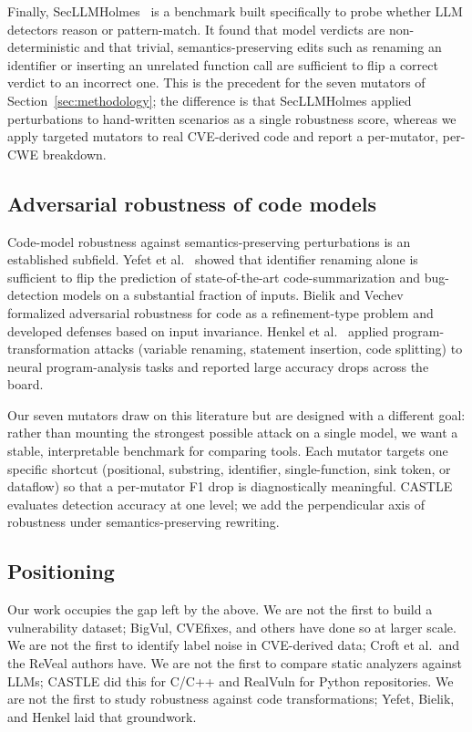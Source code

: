 Finally, SecLLMHolmes~\cite{secllmholmes} is a benchmark built
specifically to probe whether LLM detectors reason or pattern-match.
It found that model verdicts are non-deterministic and that trivial,
semantics-preserving edits such as renaming an identifier or inserting
an unrelated function call are sufficient to flip a correct verdict
to an incorrect one. This is the precedent for the seven mutators of
Section~\ref{sec:methodology}; the difference is that SecLLMHolmes
applied perturbations to hand-written scenarios as a single robustness
score, whereas we apply targeted mutators to real CVE-derived code and
report a per-mutator, per-CWE breakdown.

\subsection{Adversarial robustness of code models}
\label{sec:related:adv}

Code-model robustness against semantics-preserving perturbations is
an established subfield. Yefet et al.~\cite{yefet} showed that
identifier renaming alone is sufficient to flip the prediction of
state-of-the-art code-summarization and bug-detection models on a
substantial fraction of inputs. Bielik and Vechev~\cite{bielik}
formalized adversarial robustness for code as a refinement-type
problem and developed defenses based on input invariance. Henkel
et al.~\cite{henkel} applied program-transformation attacks
(variable renaming, statement insertion, code splitting) to neural
program-analysis tasks and reported large accuracy drops across the
board.

Our seven mutators draw on this literature but are designed with a
different goal: rather than mounting the strongest possible attack
on a single model, we want a stable, interpretable benchmark for
comparing tools. Each mutator targets one specific shortcut
(positional, substring, identifier, single-function, sink token,
or dataflow) so that a per-mutator F1 drop is diagnostically
meaningful. CASTLE evaluates
detection accuracy at one level; we add the perpendicular axis of
robustness under semantics-preserving rewriting.

\subsection{Positioning}
\label{sec:related:positioning}

Our work occupies the gap left by the above. We are not the first
to build a vulnerability dataset; BigVul, CVEfixes, and others have
done so at larger scale. We are not the first to identify label
noise in CVE-derived data; Croft et al.\ and the ReVeal authors
have. We are not the first to compare static analyzers against
LLMs; CASTLE did this for C/C++ and RealVuln for Python
repositories. We are not the first to study robustness against
code transformations; Yefet, Bielik, and Henkel laid that
groundwork.

